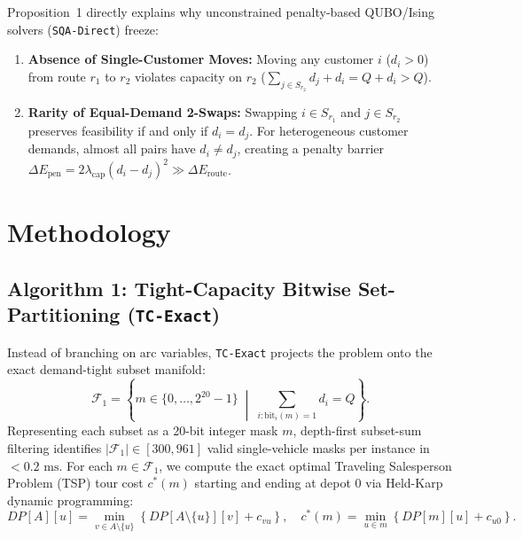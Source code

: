 \documentclass[10pt,a4paper]{article}
\begin{document}
Proposition~1 directly explains why unconstrained penalty-based QUBO/Ising solvers (\texttt{SQA-Direct}) freeze:
\begin{enumerate}
  \item \textbf{Absence of Single-Customer Moves:} Moving any customer $i$ ($d_i > 0$) from route $r_1$ to $r_2$ violates capacity on $r_2$ ($\sum_{j \in S_{r_2}} d_j + d_i = Q + d_i > Q$).
  \item \textbf{Rarity of Equal-Demand 2-Swaps:} Swapping $i \in S_{r_1}$ and $j \in S_{r_2}$ preserves feasibility if and only if $d_i = d_j$. For heterogeneous customer demands, almost all pairs have $d_i \neq d_j$, creating a penalty barrier $\Delta E_{\text{pen}} = 2 \lambda_{\text{cap}} (d_i - d_j)^2 \gg \Delta E_{\text{route}}$.
\end{enumerate}

\section{Methodology}

\subsection{Algorithm 1: Tight-Capacity Bitwise Set-Partitioning (\texttt{TC-Exact})}

Instead of branching on arc variables, \texttt{TC-Exact} projects the problem onto the exact demand-tight subset manifold:
\begin{equation}
  \mathcal{F}_1 = \left\{ m \in \{0,\dots,2^{20}-1\} \;\middle|\; \sum_{i : \text{bit}_i(m)=1} d_i = Q \right\}.
\end{equation}
Representing each subset as a 20-bit integer mask $m$, depth-first subset-sum filtering identifies $|\mathcal{F}_1| \in [300, 961]$ valid single-vehicle masks per instance in $<0.2\text{ ms}$. For each $m \in \mathcal{F}_1$, we compute the exact optimal Traveling Salesperson Problem (TSP) tour cost $c^*(m)$ starting and ending at depot $0$ via Held-Karp dynamic programming:
\begin{equation}
  DP[A][u] = \min_{v \in A \setminus \{u\}} \left\{ DP[A \setminus \{u\}][v] + c_{vu} \right\}, \quad c^*(m) = \min_{u \in m} \left\{ DP[m][u] + c_{u0} \right\}.
\end{equation}
\end{document}

